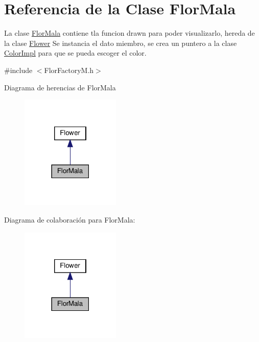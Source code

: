 \hypertarget{classFlorMala}{}\section{Referencia de la Clase Flor\+Mala}
\label{classFlorMala}


La clase \hyperlink{classFlorMala}{Flor\+Mala} contiene tla funcion drawn para poder visualizarlo, hereda de la clase \hyperlink{classFlower}{Flower}  Se instancia el dato miembro, se crea un puntero a la clase \hyperlink{classColorImpl}{Color\+Impl} para que se pueda escoger el color.  




{\ttfamily \#include $<$Flor\+Factory\+M.\+h$>$}



Diagrama de herencias de Flor\+Mala
\nopagebreak
\begin{figure}[H]
\begin{center}
\leavevmode
\includegraphics[width=134pt]{classFlorMala__inherit__graph}
\end{center}
\end{figure}


Diagrama de colaboración para Flor\+Mala\+:
\nopagebreak
\begin{figure}[H]
\begin{center}
\leavevmode
\includegraphics[width=134pt]{classFlorMala__coll__graph}
\end{center}
\end{figure}
